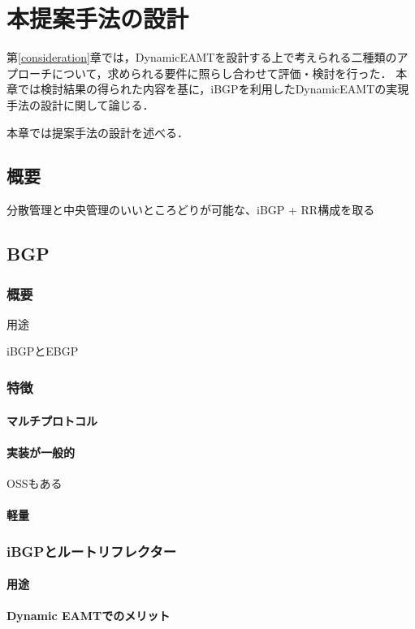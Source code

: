 \chapter{本提案手法の設計}
\label{proposal}
第\ref{consideration}章では，DynamicEAMTを設計する上で考えられる二種類のアプローチについて，求められる要件に照らし合わせて評価・検討を行った．
本章では検討結果の得られた内容を基に，iBGPを利用したDynamicEAMTの実現手法の設計に関して論じる．


本章では提案手法の設計を述べる．

\section{概要}
分散管理と中央管理のいいところどりが可能な、iBGP + RR構成を取る


\section{BGP}
\subsection{概要}
用途

iBGPとEBGP

\subsection{特徴}
\subsubsection{マルチプロトコル}
\subsubsection{実装が一般的}
OSSもある
\subsubsection{軽量}

\subsection{iBGPとルートリフレクター}
\subsubsection{用途}
\subsubsection{Dynamic EAMTでのメリット}

